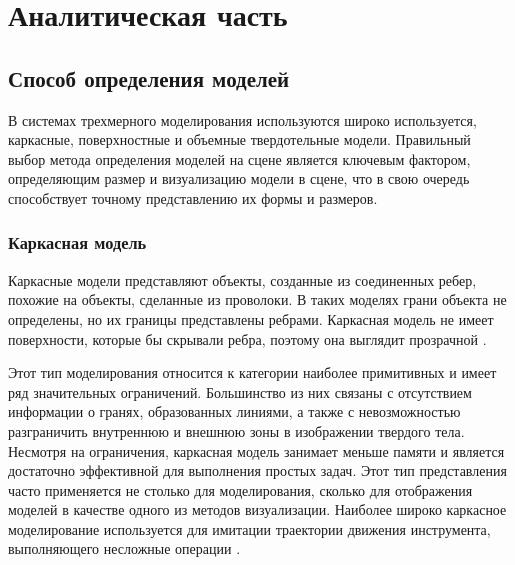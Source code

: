 \chapter{Аналитическая часть}

\section{Способ определения моделей}

В системах трехмерного моделирования используются широко используется, каркасные, поверхностные и объемные твердотельные модели. Правильный выбор метода определения моделей на сцене является ключевым фактором, определяющим размер и визуализацию модели в сцене, что в свою очередь способствует точному представлению их формы и размеров.

\subsection{Каркасная модель}
Каркасные модели представляют объекты, созданные из соединенных
ребер, похожие на объекты, сделанные из проволоки. В таких моделях грани объекта не определены, но их границы представлены ребрами. Каркасная модель не имеет поверхности, которые бы скрывали ребра, поэтому она выглядит прозрачной \cite{model_geom}.

Этот тип моделирования относится к категории наиболее примитивных и имеет ряд значительных ограничений. Большинство из них связаны с отсутствием информации о гранях, образованных линиями, а также с невозможностью разграничить внутреннюю и внешнюю зоны в изображении твердого тела. Несмотря на ограничения, каркасная модель занимает меньше памяти и является достаточно эффективной для выполнения простых задач. Этот тип представления часто применяется не столько для моделирования, сколько для отображения моделей в качестве одного из методов визуализации. Наиболее широко каркасное моделирование используется для имитации траектории движения инструмента, выполняющего несложные операции \cite{model_geom_01}.

